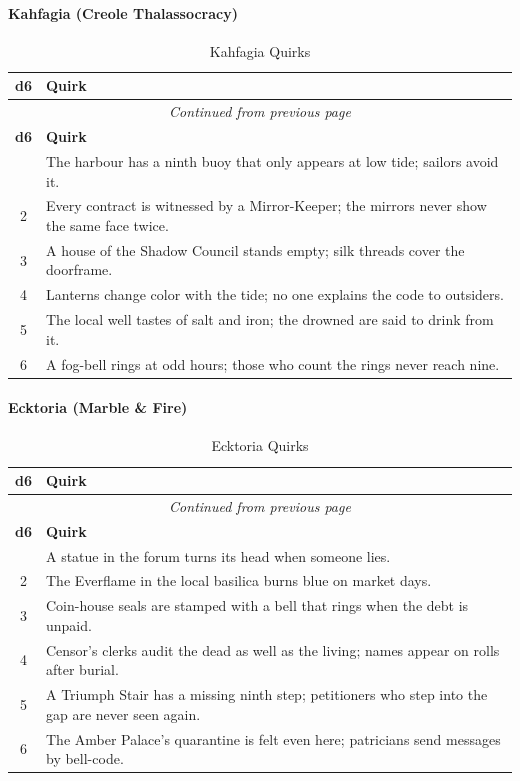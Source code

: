 \paragraph{Kahfagia (Creole Thalassocracy)}
\begin{center}
\begin{longtable}{cl}
\caption{Kahfagia Quirks}\\
\toprule
\textbf{d6} & \textbf{Quirk} \\
\midrule
\endfirsthead
\multicolumn{2}{c}{\emph{Continued from previous page}} \\
\toprule
\textbf{d6} & \textbf{Quirk} \\
\midrule
\endhead
\bottomrule
\endfoot
1 & The harbour has a ninth buoy that only appears at low tide; sailors avoid it. \\
2 & Every contract is witnessed by a Mirror-Keeper; the mirrors never show the same face twice. \\
3 & A house of the Shadow Council stands empty; silk threads cover the doorframe. \\
4 & Lanterns change color with the tide; no one explains the code to outsiders. \\
5 & The local well tastes of salt and iron; the drowned are said to drink from it. \\
6 & A fog-bell rings at odd hours; those who count the rings never reach nine. \\
\end{longtable}
\end{center}

\paragraph{Ecktoria (Marble \& Fire)}
\begin{center}
\begin{longtable}{cl}
\caption{Ecktoria Quirks}\\
\toprule
\textbf{d6} & \textbf{Quirk} \\
\midrule
\endfirsthead
\multicolumn{2}{c}{\emph{Continued from previous page}} \\
\toprule
\textbf{d6} & \textbf{Quirk} \\
\midrule
\endhead
\bottomrule
\endfoot
1 & A statue in the forum turns its head when someone lies. \\
2 & The Everflame in the local basilica burns blue on market days. \\
3 & Coin-house seals are stamped with a bell that rings when the debt is unpaid. \\
4 & Censor's clerks audit the dead as well as the living; names appear on rolls after burial. \\
5 & A Triumph Stair has a missing ninth step; petitioners who step into the gap are never seen again. \\
6 & The Amber Palace's quarantine is felt even here; patricians send messages by bell-code. \\
\end{longtable}
\end{center}

